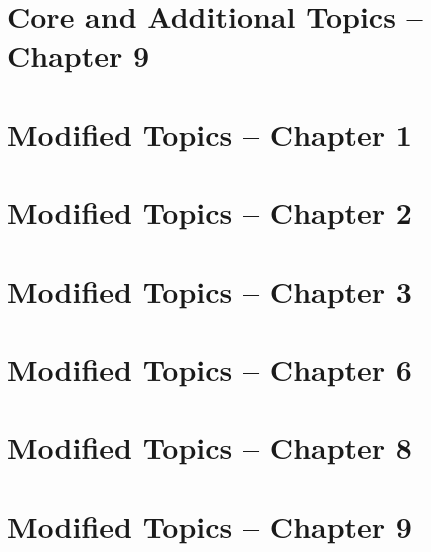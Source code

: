 \documentclass[12pt, fleqn, openany, oneside]{studyGuide}
\begin{document}
\chapter{Core and Additional Topics -- Chapter 9}









\chapter{Modified Topics -- Chapter 1}


\chapter{Modified Topics -- Chapter 2}



\chapter{Modified Topics -- Chapter 3}



\chapter{Modified Topics -- Chapter 6}



\chapter{Modified Topics -- Chapter 8}




\chapter{Modified Topics -- Chapter 9}


\printAnswerKey
\end{document}
